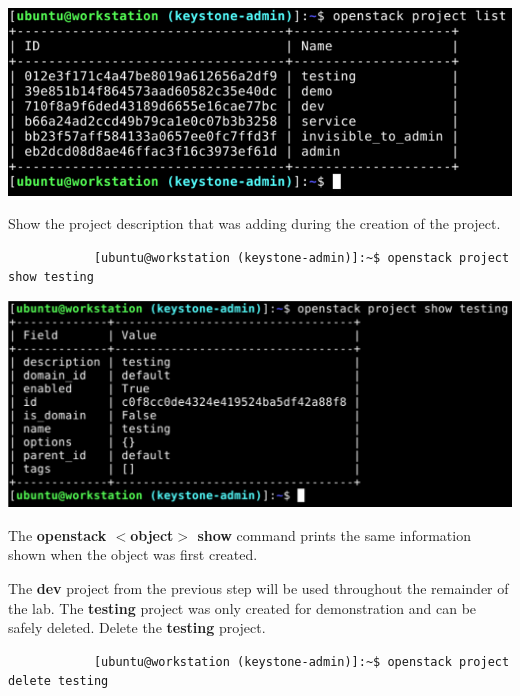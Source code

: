 \documentclass[letterpaper, 12pt]{article}
\begin{document}
\begin{enumerate}
\begin{labstep}
        \begin{center}
            \includegraphics[width=\linewidth]{images/part2/step5.png}
        \end{center}
    \end{labstep}

    \begin{labstep}
        Show the project description that was adding during the creation of the project.
        \begin{lstlisting}
            [ubuntu@workstation (keystone-admin)]:~$ openstack project show testing
        \end{lstlisting}

        \begin{center}
            \includegraphics[width=\linewidth]{images/part2/step6.png}
        \end{center}
    \end{labstep}

    \begin{tipbox}
        The \textbf{openstack $<$object$>$ show} command prints the same information shown when the object was first created.
    \end{tipbox}

    \begin{labstep}
        The \textbf{dev} project from the previous step will be used throughout the remainder of the lab.
        The \textbf{testing} project was only created for demonstration and can be safely deleted.
        Delete the \textbf{testing} project.
        \begin{lstlisting}
            [ubuntu@workstation (keystone-admin)]:~$ openstack project delete testing
        \end{lstlisting}


\end{labstep}
\end{enumerate}
\end{document}
